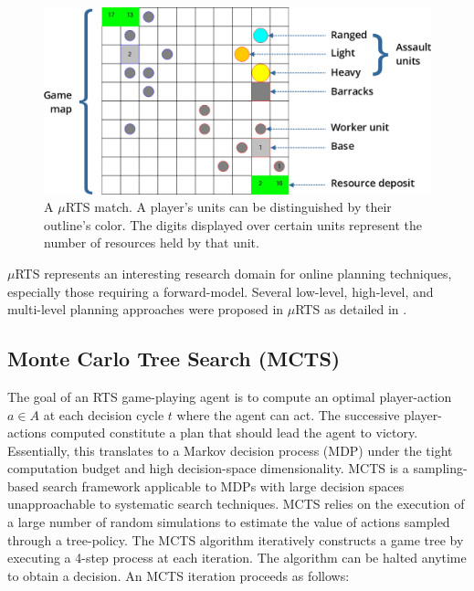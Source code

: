 \documentclass[conference]{IEEEtran}
\newcommand{\mRTS}{$\mu$RTS}
\begin{document}

\begin{figure}[t]
\begin{center}
	\includegraphics[scale=1]{figs/mRTS.png}
	\caption{A \mRTS{} match. A player's units can be distinguished by their outline's color. The digits displayed over certain units represent the number of resources held by that unit.}
	\label{mRTSScreenshot}
\end{center}
\end{figure}

\mRTS{} represents an interesting research domain for online planning techniques, especially those requiring a forward-model. Several low-level, high-level, and multi-level planning approaches were proposed in \mRTS{} as detailed in \cite{ouessai_online_2019}.


\subsection{Monte Carlo Tree Search (MCTS)}

The goal of an RTS game-playing agent is to compute an optimal player-action $a \in A$ at each decision cycle $t$ where the agent can act. The successive player-actions computed constitute a plan that should lead the agent to victory. Essentially, this translates to a Markov decision process (MDP) under the tight computation budget and high decision-space dimensionality. MCTS is a sampling-based search framework applicable to MDPs with large decision spaces unapproachable to systematic search techniques. MCTS relies on the execution of a large number of random simulations to estimate the value of actions sampled through a tree-policy. The MCTS algorithm iteratively constructs a game tree by executing a 4-step process at each iteration. The algorithm can be halted anytime to obtain a decision. An MCTS iteration proceeds as follows:
\end{document}
